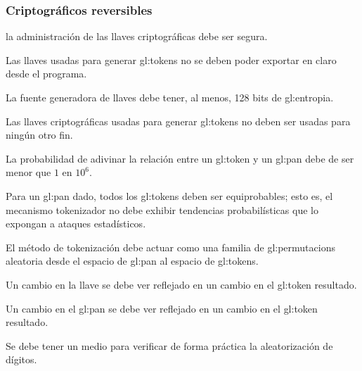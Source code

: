 %
%

\subsubsection{Criptográficos reversibles}

{
  la administración de las llaves criptográficas debe ser segura.

  {
    Las llaves usadas para generar \glspl{gl:token} no se deben poder
    exportar en claro desde el programa.
  }

  {
    La fuente generadora de llaves debe tener, al menos, 128 bits de
    \gls{gl:entropia}.
  }

  {
    Las llaves criptográficas usadas para generar \glspl{gl:token} no
    deben ser usadas para ningún otro fin.
  }
}

{
  La probabilidad de adivinar la relación entre un \gls{gl:token} y un
  \gls{gl:pan} debe de ser menor que $ 1 $ en $ 10^6 $.

  {
    Para un \gls{gl:pan} dado, todos los \glspl{gl:token} deben ser
    equiprobables; esto es, el mecanismo tokenizador no debe exhibir
    tendencias probabilísticas que lo expongan a ataques estadísticos.
  }

  {
    El método de tokenización debe actuar como una familia de
    \glspl{gl:permutacion} aleatoria desde el espacio de \gls{gl:pan} al
    espacio de \glspl{gl:token}.
  }

  {
    Un cambio en la llave se debe ver reflejado en un cambio en el
    \gls{gl:token} resultado.
  }

  {
    Un cambio en el \gls{gl:pan} se debe ver reflejado en un cambio en el
    \gls{gl:token} resultado.
  }

  {
    Se debe tener un medio para verificar de forma práctica la aleatorización
    de dígitos.
  }

}


